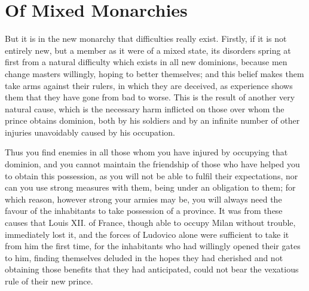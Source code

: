 \documentclass[12pt,letterpaper]{memoir}
\begin{document}
\chapter{Of Mixed Monarchies}

But it is in the new monarchy that difficulties really exist. Firstly,
if it is not entirely new, but a member as it were of a mixed state,
its disorders spring at first from a natural difficulty which exists
in all new dominions, because men change masters willingly, hoping to
better themselves; and this belief makes them take arms against their
rulers, in which they are deceived, as experience shows them that they
have gone from bad to worse. This is the result of another very natural
cause, which is the necessary harm inflicted on those over whom the
prince obtains dominion, both by his soldiers and by an infinite number
of other injuries unavoidably caused by his occupation.

Thus you find enemies in all those whom you have injured by occupying
that dominion, and you cannot maintain the friendship of those who have
helped you to obtain this possession, as you will not be able to fulfil
their expectations, nor can you use strong measures with them, being
under an obligation to them; for which reason, however strong your
armies may be, you will always need the favour of the inhabitants to
take possession of a province. It was from these causes that Louis XII.
of France, though able to occupy Milan without trouble, immediately
lost it, and the forces of Ludovico alone were sufficient to take it
from him the first time, for the inhabitants who had willingly opened
their gates to him, finding themselves deluded in the hopes they had
cherished and not obtaining those benefits that they had anticipated,
could not bear the vexatious rule of their new prince.
\end{document}
